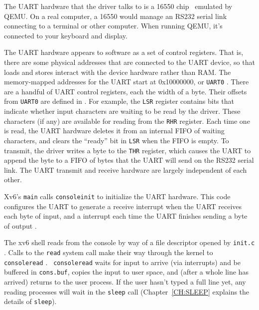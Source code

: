 The UART hardware that the driver talks to is a 16550
chip~\cite{ns16550a} emulated by QEMU. On a real computer, a 16550
would manage an RS232 serial link connecting to a terminal or other
computer. When running QEMU, it's connected to your keyboard and
display.

The UART hardware appears to software as a set of 
control registers. That is, there are some physical addresses that 
are connected to the UART device, so that loads and stores
interact with the device hardware rather than RAM.
The memory-mapped addresses for the UART start at 0x10000000, or {\tt UART0}
.
There are a handful of UART control registers, each the width
of a byte. Their offsets from {\tt UART0} are defined in
. For example, the
{\tt LSR} register contains bits that indicate whether input
characters are waiting to be read by the driver. These
characters (if any) are available for reading from the
{\tt RHR} register. Each time one is read, the UART hardware
deletes it from an internal FIFO of waiting characters, and
clears the ``ready'' bit in {\tt LSR} when the FIFO is empty.
To transmit, the driver writes a byte to the {\tt THR} register,
which causes the UART to append the byte to a FIFO of bytes that the
UART will send on the RS232 serial link.
The UART transmit and receive hardware are largely independent
of each other.

Xv6's {\tt main} calls {\tt consoleinit}
 to initialize the UART
hardware. This code configures the UART to generate 
a receive 
interrupt when the UART receives each byte of input, and
a  interrupt each time the
UART finishes sending a byte of output .

The xv6 shell reads from the console by way of a file descriptor
opened by {\tt init.c} . Calls to
the {\tt read} system call make their way through the kernel to {\tt
  consoleread} . {\tt
  consoleread} waits for input to arrive (via interrupts) and be
buffered in {\tt cons.buf}, copies the input to user space, and (after
a whole line has arrived) returns to the user process. If the user
hasn't typed a full line yet, any reading processes will wait in the
{\tt sleep} call
(Chapter~\ref{CH:SLEEP} explains the details of {\tt sleep}).

